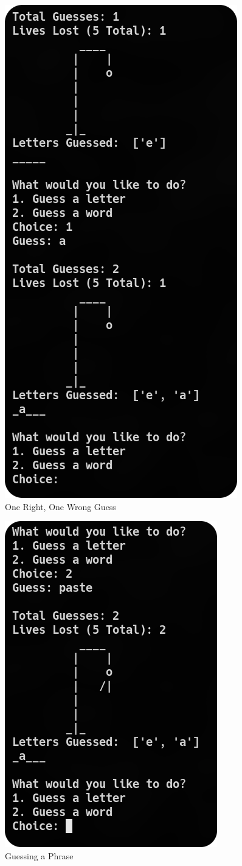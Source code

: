\documentclass[
	letterpaper, %
	10pt, %
]{CSUniSchoolLabReport}
\begin{document}
  \begin{figure}[H]
    \centering
    \includegraphics[width=.6\textwidth]{Figures/onerightonewrong.png}
    \caption{One Right, One Wrong Guess}
    \label{fig:2}
  \end{figure}

  \begin{figure}[H]
    \centering
    \includegraphics[width=.6\textwidth]{Figures/guessphrase.png}
    \caption{Guessing a Phrase}
    \label{fig:3}
  \end{figure}
\end{document}

